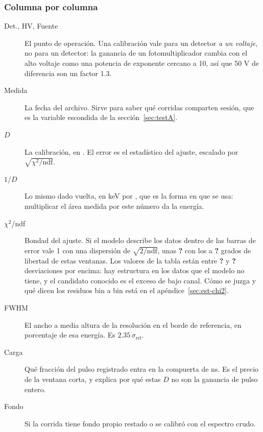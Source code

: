 \documentclass[11pt,a4paper]{article}
\newcommand{\faltaMacro}{\textbf{?}}
\providecommand{\EjSigmaNdf}{\faltaMacro}\providecommand{\EjDosSigmaNdf}{\faltaMacro}
\providecommand{\NdfMax}{\faltaMacro}\providecommand{\ChiSigmasMin}{\faltaMacro}
\providecommand{\ChiSigmasMax}{\faltaMacro}
\begin{document}
\begin{center}
\label{tab:calib}
{\footnotesize\setlength{\tabcolsep}{4pt}}
\end{center}

\subsubsection{Columna por columna}

\begin{description}
\item[Det., HV, Fuente] El punto de operación. Una calibración vale para un
      detector \emph{a un voltaje}, no para un detector: la ganancia de un
      fotomultiplicador cambia con el alto voltaje como una potencia de
      exponente cercano a 10, así que 50 V de diferencia son un factor 1.3.
\item[Medida] La fecha del archivo. Sirve para saber qué corridas comparten
      sesión, que es la variable escondida de la sección~\ref{sec:testA}.
\item[$D$] La calibración, en \DkeV. El error es el estadístico del ajuste,
      escalado por $\sqrt{\chi^2/\text{ndf}}$.
\item[$1/D$] Lo mismo dado vuelta, en keV por \mVns, que es la forma en que se
      usa: multiplicar el área medida por este número da la energía.
\item[$\chi^2$/ndf] Bondad del ajuste. Si el modelo describe los datos
      dentro de las barras de error vale 1 con una dispersión de
      $\sqrt{2/\text{ndf}}$, unas \EjSigmaNdf{} con los \NdfMin{} a \NdfMax{}
      grados de libertad de estas ventanas. Los valores de la tabla están
      entre \ChiSigmasMin{} y \ChiSigmasMax{} desviaciones por encima: hay
      estructura en los datos que el modelo no tiene, y el candidato conocido
      es el exceso de bajo canal. Cómo se juzga y qué dicen los residuos bin a
      bin está en el apéndice~\ref{sec:est-chi2}.
\item[FWHM] El ancho a media altura de la resolución en el borde de
      referencia, en porcentaje de esa energía. Es
      $2.35\,\sigma_{\text{rel}}$.
\item[Carga] Qué fracción del pulso registrado entra en la compuerta de
      \PostFijo{} ns. Es el precio de la ventana corta, y explica por qué estas
      $D$ no son la ganancia de pulso entero.
\item[Fondo] Si la corrida tiene fondo propio restado o se calibró con el
      espectro crudo.
\end{description}
\end{document}
